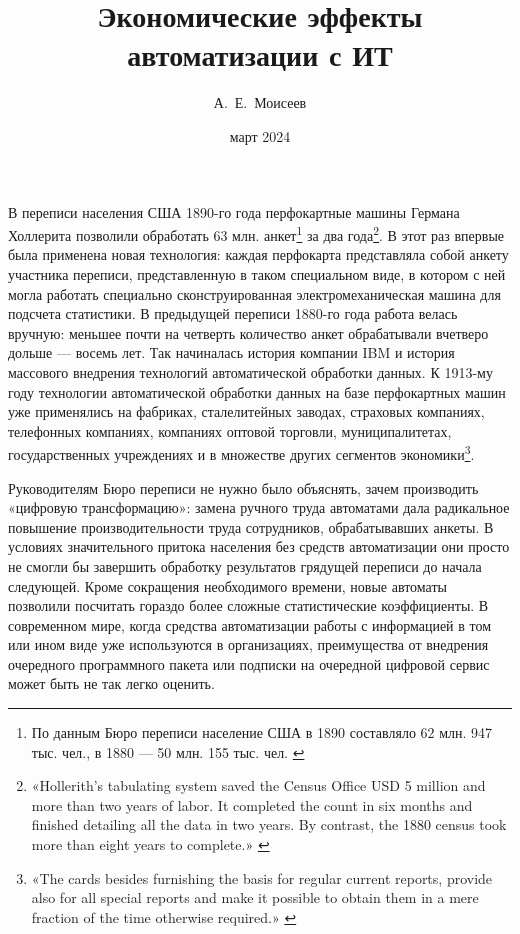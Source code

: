 \documentclass{article}
\title{Экономические эффекты автоматизации с ИТ}
\author{А.~Е.~Моисеев}
\date{март 2024}
\begin{document}
\maketitle

В переписи населения США 1890-го года перфокартные машины Германа Холлерита позволили обработать 63 млн. анкет\footnote{По данным Бюро переписи население США в 1890 составляло 62 млн. 947 тыс. чел., в 1880 — 50 млн. 155 тыс. чел. \cite{usCensus}} за два года\footnote{«Hollerith’s tabulating system saved the Census Office USD 5 million and more than two years of labor. It completed the count in six months and finished detailing all the data in two years. By contrast, the 1880 census took more than eight years to complete.» \cite{ibmPuchCardTabulator}}. В этот раз впервые была применена новая технология: каждая перфокарта представляла собой анкету участника переписи, представленную в таком специальном виде, в котором с ней могла работать специально сконструированная электромеханическая машина для подсчета статистики. В предыдущей переписи 1880-го года работа велась вручную: меньшее почти на четверть количество анкет обрабатывали вчетверо дольше — восемь лет. Так начиналась история компании IBM и история массового внедрения технологий автоматической обработки данных. К 1913-му году технологии автоматической обработки данных на базе перфокартных машин уже применялись на фабриках, сталелитейных заводах, страховых компаниях, телефонных компаниях, компаниях оптовой торговли, муниципалитетах, государственных учреждениях и в множестве других сегментов экономики\footnote{«The cards besides furnishing the basis for regular current reports, provide also for all special reports and make it possible to obtain them in a mere fraction of the time otherwise required.» \cite{machinery1913}}.

Руководителям Бюро переписи не нужно было объяснять, зачем производить «цифровую трансформацию»: замена ручного труда автоматами дала радикальное повышение производительности труда сотрудников, обрабатывавших анкеты. В условиях значительного притока населения без средств автоматизации они просто не смогли бы завершить обработку результатов грядущей переписи до начала следующей. Кроме сокращения необходимого времени, новые автоматы позволили посчитать гораздо более сложные статистические коэффициенты. В современном мире, когда средства автоматизации работы с информацией в том или ином виде уже используются в организациях, преимущества от внедрения очередного программного пакета или подписки на очередной цифровой сервис может быть не так легко оценить.
\end{document}
